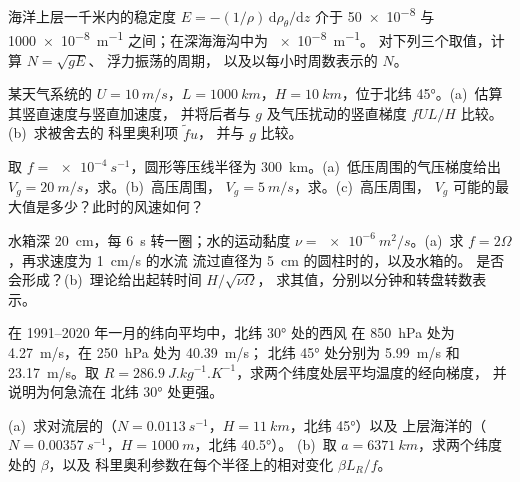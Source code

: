 \begin{exercise}[$\star$]\label{exo:b3:gfd-foundations:4}
海洋上层一千米内的稳定度 $E = -(1/\rho)\,\mathrm d\rho_\theta/\mathrm dz$
介于 \num{50e-8} 与 \qty{1000e-8}{m^{-1}} 之间；在深海海沟中为 \qty{e-8}{m^{-1}}。
对下列三个取值，计算 $N = \sqrt{gE}$、
浮力振荡的周期，
以及以每小时周数表示的 $N$。
\end{exercise}

\begin{exercise}[$\star\star$]\label{exo:b3:gfd-foundations:5}
某天气系统的 $U = \qty{10}{m/s}$，$L = \qty{1000}{km}$，$H =
\qty{10}{km}$，位于北纬 \ang{45}。(a)~估算其竖直速度与竖直加速度，
并将后者与 $g$ 及气压扰动的竖直梯度 $fUL/H$ 比较。(b)~求被舍去的
科里奥利项 $\tilde fu$，
并与 $g$ 比较。
\end{exercise}

\begin{exercise}[$\star\star$]\label{exo:b3:gfd-foundations:6}
取 $f = \qty{e-4}{s^{-1}}$，圆形等压线半径为
\qty{300}{km}。(a)~低压周围的气压梯度给出 $V_g =
\qty{20}{m/s}$，求。(b)~高压周围，
$V_g = \qty{5}{m/s}$，求。(c)~高压周围，
$V_g$ 可能的最大值是多少？此时的风速如何？
\end{exercise}

\begin{exercise}[$\star\star$]\label{exo:b3:gfd-foundations:7}
水箱深 \qty{20}{cm}，每 \qty{6}{s} 转一圈；水的运动黏度 $\nu =
\qty{e-6}{m^2/s}$。(a)~求 $f = 2\Omega$，再求速度为 \qty{1}{cm/s} 的水流
流过直径为 \qty{5}{cm} 的圆柱时的，以及水箱的。
是否会形成？(b)~理论给出起转时间 $H/\sqrt{\nu\Omega}$，
求其值，分别以分钟和转盘转数表示。
\end{exercise}

\begin{exercise}[$\star\star$]\label{exo:b3:gfd-foundations:8}
在 1991--2020 年一月的纬向平均中，北纬 \ang{30} 处的西风
在 \qty{850}{hPa} 处为 \qty{4.27}{m/s}，在 \qty{250}{hPa} 处为 \qty{40.39}{m/s}；
北纬 \ang{45} 处分别为 \qty{5.99}{m/s} 和 \qty{23.17}{m/s}。取 $R =
\qty{286.9}{J.kg^{-1}.K^{-1}}$，求两个纬度处层平均温度的经向梯度，
并说明为何急流在
北纬 \ang{30} 处更强。
\end{exercise}

\begin{exercise}[$\star\star$]\label{exo:b3:gfd-foundations:9}
(a)~求对流层的（$N =
\qty{0.0113}{s^{-1}}$，$H = \qty{11}{km}$，北纬 \ang{45}）以及
上层海洋的（$N = \qty{0.00357}{s^{-1}}$，$H = \qty{1000}{m}$，北纬 \ang{40.5}）。
(b)~取 $a = \qty{6371}{km}$，求两个纬度处的 $\beta$，以及
科里奥利参数在每个半径上的相对变化 $\beta L_R/f$。
\end{exercise}

